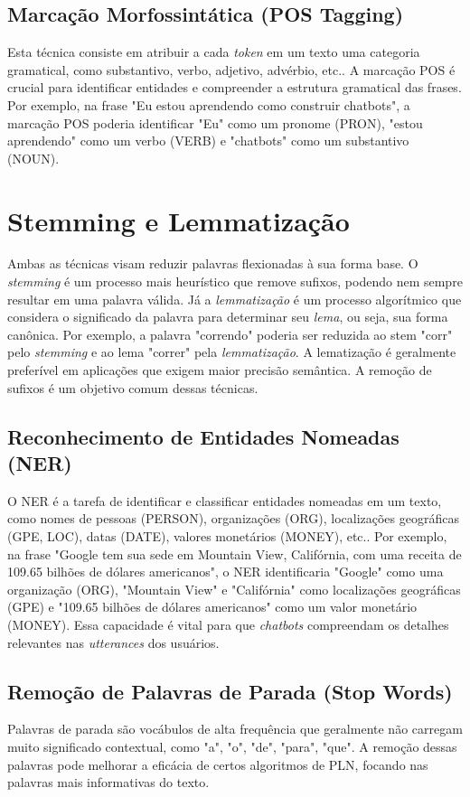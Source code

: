 \documentclass[14pt,a4paper,oneside]{book}
\begin{document}
\subsection{Marcação Morfossintática (POS Tagging)}

Esta técnica consiste em atribuir a cada \textit{token} em um texto uma categoria gramatical, como substantivo, verbo, adjetivo, advérbio, etc.. A marcação POS é crucial para identificar entidades e compreender a estrutura gramatical das frases. Por exemplo, na frase "Eu estou aprendendo como construir chatbots", a marcação POS poderia identificar "Eu" como um pronome (PRON), "estou aprendendo" como um verbo (VERB) e "chatbots" como um substantivo (NOUN).

\section{Stemming e Lemmatização}
Ambas as técnicas visam reduzir palavras flexionadas à sua forma base. O \textit{stemming} é um processo mais heurístico que remove sufixos, podendo nem sempre resultar em uma palavra válida. Já a \textit{lemmatização} é um processo algorítmico que considera o significado da palavra para determinar seu \textit{lema}, ou seja, sua forma canônica. Por exemplo, a palavra "correndo" poderia ser reduzida ao stem "corr" pelo \textit{stemming} e ao lema "correr" pela \textit{lemmatização}. A lematização é geralmente preferível em aplicações que exigem maior precisão semântica. A remoção de sufixos é um objetivo comum dessas técnicas.

\subsection{Reconhecimento de Entidades Nomeadas (NER)}
O NER é a tarefa de identificar e classificar entidades nomeadas em um texto, como nomes de pessoas (PERSON), organizações (ORG), localizações geográficas (GPE, LOC), datas (DATE), valores monetários (MONEY), etc.. Por exemplo, na frase "Google tem sua sede em Mountain View, Califórnia, com uma receita de 109.65 bilhões de dólares americanos", o NER identificaria "Google" como uma organização (ORG), "Mountain View" e "Califórnia" como localizações geográficas (GPE) e "109.65 bilhões de dólares americanos" como um valor monetário (MONEY). Essa capacidade é vital para que \textit{chatbots} compreendam os detalhes relevantes nas \textit{utterances} dos usuários.

\subsection{Remoção de Palavras de Parada (Stop Words)}
Palavras de parada são vocábulos de alta frequência que geralmente não carregam muito significado contextual, como "a", "o", "de", "para", "que". A remoção dessas palavras pode melhorar a eficácia de certos algoritmos de PLN, focando nas palavras mais informativas do texto.
\end{document}
